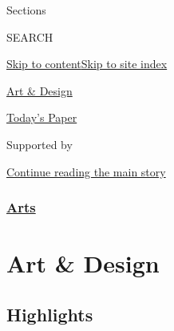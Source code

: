 Sections

SEARCH

\protect\hyperlink{site-content}{Skip to
content}\protect\hyperlink{site-index}{Skip to site index}

\href{https://www.nytimes3xbfgragh.onion/section/arts/design}{Art \&
Design}

\href{https://myaccount.nytimes3xbfgragh.onion/auth/login?response_type=cookie\&client_id=vi}{}

\href{https://www.nytimes3xbfgragh.onion/section/todayspaper}{Today's
Paper}

Supported by

\protect\hyperlink{after-sponsor}{Continue reading the main story}

\hypertarget{arts}{%
\subsubsection{\texorpdfstring{\href{/section/arts}{Arts}}{Arts}}\label{arts}}

\hypertarget{art--design}{%
\section{Art \& Design}\label{art--design}}

\hypertarget{highlights}{%
\subsection{Highlights}\label{highlights}}

